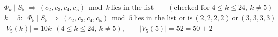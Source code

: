 \documentclass{article}
\begin{document}
\[
\begin{aligned}
&\Phi_k\mid S_5\ \Longrightarrow\ (c_2,c_3,c_4,c_5)\bmod k\ \text{lies in the list}\qquad(\text{checked for }4\le k\le 24,\ k\ne5)\\
&k=5:\ \ \Phi_5\mid S_5\ \Longrightarrow\ (c_2,c_3,c_4,c_5)\bmod 5\ \text{lies in the list or is}\ (2,2,2,2)\ \text{or}\ (3,3,3,3)\\
&|V_5(k)|=10k\ \ (4\le k\le 24,\ k\ne5),\qquad |V_5(5)|=52=50+2
\end{aligned}
\]
\end{document}
